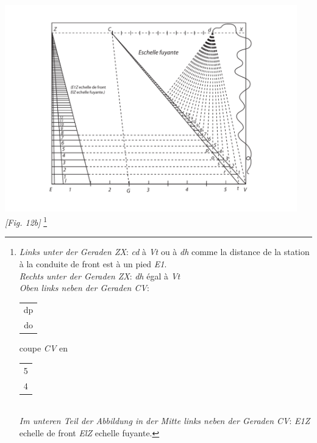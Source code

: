 \begin{center}
\includegraphics[width=0.95\textwidth]{images/T29-Desargues_87_b}
\\\textit{[Fig. 12b]}
\footnote{\textit{Links unter der Geraden ZX}: \textit{cd} \`{a} \textit{Vt} ou \`{a} \textit{dh} comme la distance de la station \`{a} la conduite de front est \`{a} un pied \textit{E1}. \\ \textit{Rechts unter der Geraden }\textit{ZX}: \textit{dh} \'{e}gal \`{a} \textit{Vt} \\ \textit{Oben links neben der Geraden CV}: \protect\begin{tabular}{c} dp\\do\protect\end{tabular} coupe \textit{CV} en \protect\begin{tabular}{c} 5\\4\protect\end{tabular}\rule[-4mm]{0mm}{10mm}  \\ \textit{Im unteren Teil der Abbildung in der Mitte links neben der Geraden CV}: \textit{E1Z} echelle de front\protect{} \textit{ElZ} echelle fuyante\protect{}.}
\end{center}